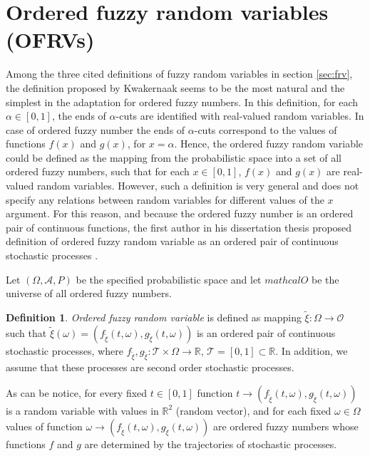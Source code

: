 \documentclass[review]{elsarticle}
\theoremstyle{definition}
\newtheorem{definition}{Definition}
\theoremstyle{theorem}
\begin{document}
\section{Ordered fuzzy random variables (OFRVs)}
Among the three cited definitions of fuzzy random variables in section \ref{sec:frv}, the definition proposed by Kwakernaak seems to be the most natural and the simplest in the adaptation for ordered fuzzy numbers. In this definition, for each $\alpha\in [0, 1]$, the ends of $\alpha$-cuts are identified with real-valued random variables. In case of ordered fuzzy number the ends of $\alpha$-cuts correspond to the values of functions $f(x)$ and $g(x)$, for $x = \alpha$. Hence, the ordered fuzzy random variable could be defined as the mapping from the probabilistic space into a set of all ordered fuzzy numbers, such that for each $x\in [0, 1]$, $f(x)$ and $g(x)$ are real-valued random variables. However, such a definition is very general and does not specify any relations between random variables for different values of the $x$ argument. For this reason, and because the ordered fuzzy number is an ordered pair of continuous functions, the first author in his dissertation thesis proposed definition of ordered fuzzy random variable as an ordered pair of continuous stochastic processes \cite{marszalek2017}.

Let $(\Omega, \mathcal{A}, P)$ be the specified probabilistic space and let $ mathcal{O}$ be the universe of all ordered fuzzy numbers.

\begin{definition}
{\it Ordered fuzzy random variable} is defined  as mapping  $\tilde{\xi} \colon \Omega \to \mathcal {O}$ such that $ \tilde{\xi}(\omega) = \left(f_{\tilde{\xi}}(t, \omega), g_{\tilde{\xi}}(t, \omega)\right)$ is an ordered pair of continuous stochastic processes, where $f_{\tilde{\xi}}, g_{\tilde{\xi}} \colon \mathcal{T}\times \Omega \to \mathbb{R}$, $ \mathcal{T} = [0,1] \subset \mathbb{R}$. In addition, we assume that these processes are second order stochastic processes.
\end{definition}

As can be notice, for every fixed $ t \in [0,1] $ function $ t \to \left(f_{\tilde{\xi}} (t, \omega), g_{\tilde{\xi}} (t, \omega) \right) $ is a random variable with values in $ \mathbb{R}^2 $ (random vector), and for each fixed $ \omega \in \Omega $ values of function $ \omega \to \left(f_{\tilde {\xi}} (t, \omega), g_{\tilde{\xi}} (t, \omega) \right) $ are ordered fuzzy numbers whose functions $f$ and $g$ are determined by the trajectories of stochastic processes.
\end{document}
